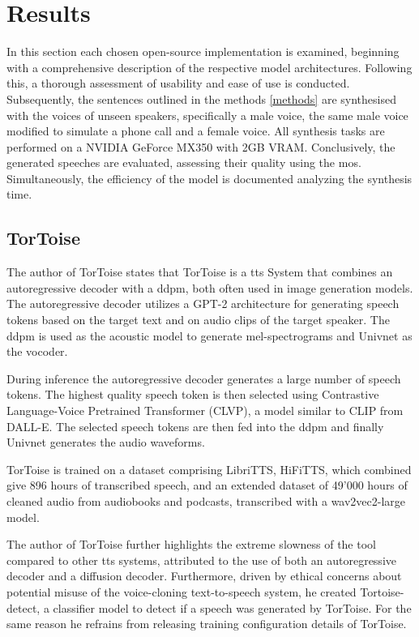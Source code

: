 \newpage
\section{Results}
In this section each chosen open-source implementation is examined, beginning with a comprehensive description of the respective model architectures. Following this, a thorough assessment of usability and ease of use is conducted. Subsequently, the sentences outlined in the methods \ref{methods} are synthesised with the voices of unseen speakers, specifically a male voice, the same male voice modified to simulate a phone call and a female voice. All synthesis tasks are performed on a NVIDIA GeForce MX350 with 2GB VRAM. Conclusively, the generated speeches are evaluated, assessing their quality using the \gls{mos}. Simultaneously, the efficiency of the model is documented analyzing the synthesis time.

\subsection{TorToise}
The author of TorToise \cite{betker2023better} states that TorToise is a \gls{tts} System that combines an autoregressive decoder with a \gls{ddpm}, both often used in image generation models.
The autoregressive decoder utilizes a GPT-2 architecture for generating speech tokens based on the target text and on audio clips of the target speaker. The \gls{ddpm} is used as the acoustic model to generate mel-spectrograms and Univnet as the vocoder.

During inference the autoregressive decoder generates a large number of speech tokens. The highest quality speech token is then selected using Contrastive Language-Voice Pretrained Transformer (CLVP), a model similar to CLIP from DALL-E. The selected speech tokens are then fed into the \gls{ddpm} and finally Univnet generates the audio waveforms.

TorToise is trained on a dataset comprising LibriTTS, HiFiTTS, which combined give 896 hours of transcribed speech, and an extended dataset of 49'000 hours of cleaned audio from audiobooks and podcasts, transcribed with a wav2vec2-large model.

The author of TorToise further highlights the extreme slowness of the tool compared to other \gls{tts} systems, attributed to the use of both an autoregressive decoder and a diffusion decoder.
Furthermore, driven by ethical concerns about potential misuse of the voice-cloning text-to-speech system, he created Tortoise-detect, a classifier model to detect if a speech was generated by TorToise. For the same reason he refrains from releasing training configuration details of TorToise. \cite{betker_tortoise_2022} 

